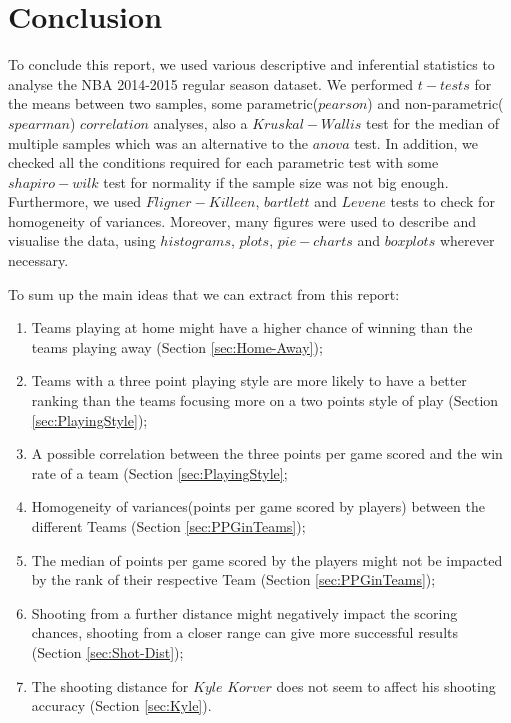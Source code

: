 \documentclass[
  12pt,
]{article}
\providecommand{\tightlist}{%
  \setlength{\itemsep}{0pt}\setlength{\parskip}{0pt}}
\begin{document}
\hypertarget{conclusion}{%
\section{Conclusion}\label{conclusion}}

To conclude this report, we used various descriptive and inferential statistics to analyse the NBA 2014-2015 regular season dataset. We performed \(t-tests\) for the means between two samples, some parametric(\(pearson\)) and non-parametric(\(spearman\)) \(correlation\) analyses, also a \(Kruskal-Wallis\) test for the median of multiple samples which was an alternative to the \(anova\) test. In addition, we checked all the conditions required for each parametric test with some \(shapiro-wilk\) test for normality if the sample size was not big enough. Furthermore, we used \(Fligner-Killeen\), \(bartlett\) and \(Levene\) tests to check for homogeneity of variances. Moreover, many figures were used to describe and visualise the data, using \(histograms\), \(plots\), \(pie-charts\) and \(boxplots\) wherever necessary.

To sum up the main ideas that we can extract from this report:

\begin{enumerate}
\def\labelenumi{\arabic{enumi}.}
\tightlist
\item
  Teams playing at home might have a higher chance of winning than the teams playing away (Section \ref{sec:Home-Away});
\item
  Teams with a three point playing style are more likely to have a better ranking than the teams focusing more on a two points style of play (Section \ref{sec:PlayingStyle});
\item
  A possible correlation between the three points per game scored and the win rate of a team (Section \ref{sec:PlayingStyle};
\item
  Homogeneity of variances(points per game scored by players) between the different Teams (Section \ref{sec:PPGinTeams});
\item
  The median of points per game scored by the players might not be impacted by the rank of their respective Team (Section \ref{sec:PPGinTeams});
\item
  Shooting from a further distance might negatively impact the scoring chances, shooting from a closer range can give more successful results (Section \ref{sec:Shot-Dist});
\item
  The shooting distance for \(Kyle\) \(Korver\) does not seem to affect his shooting accuracy (Section \ref{sec:Kyle}).
\end{enumerate}
\end{document}
